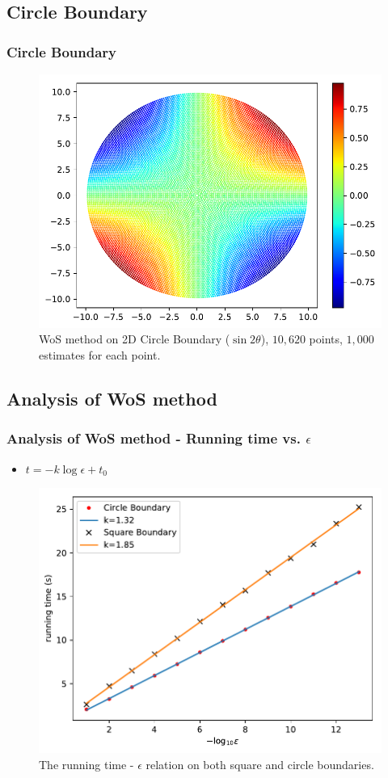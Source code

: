 \documentclass{beamer}
\begin{document}

\subsection{Circle Boundary}

\begin{frame}
\frametitle{Circle Boundary}
\begin{figure}[htbp]
    \centering
    \includegraphics[width=.75\textwidth]{./figs/wos_c}
    \caption{\label{fig:wos_c} WoS method on 2D Circle Boundary ($\sin2\theta$), $10,620$ points, $1,000$ estimates for each point.}
\end{figure}
\end{frame}


\subsection{Analysis of WoS method}

\begin{frame}
\frametitle{Analysis of WoS method - Running time vs. $\epsilon$}
\begin{itemize}
    \item $t = -k\log\epsilon + t_0$
\end{itemize}
\begin{figure}[htbp]
    \centering
    \includegraphics[width=.66\textwidth]{./figs/ep_t}
    \caption{\label{fig:ep_t} The running time - $\epsilon$ relation on both square and circle boundaries.}
\end{figure}
\end{frame}
\end{document}
